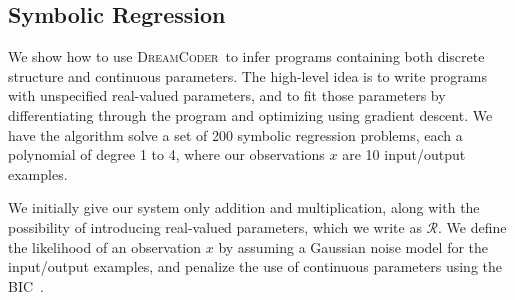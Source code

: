 \documentclass{article}
\newcommand{\system}{\textsc{DreamCoder}~}
\newcommand{\probability}{\mathds{P}} %
\begin{document}



\subsection{Symbolic Regression}\label{regressionSection}
We show how to use \system to infer programs containing both discrete
structure and continuous parameters. The high-level idea is to write programs with unspecified real-valued parameters, and to fit those parameters by differentiating through the program
and optimizing using gradient descent.
We have the algorithm 
solve a set of 200 symbolic regression problems, each a polynomial of
degree 1 to 4, where our observations $x$ are 10
input/output examples.%

We initially give our system only addition and multiplication,
along with the possibility of introducing real-valued parameters, which we write as $\mathcal{R}$.
We define the likelihood of an observation $x$ by assuming a Gaussian noise model for the input/output examples,
and penalize the use of continuous parameters using the BIC~\cite{Bishop:2006:PRM:1162264}.

\end{document}
